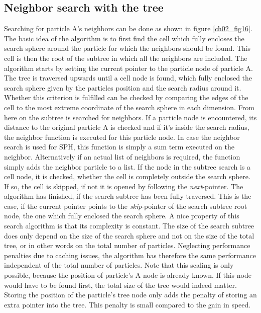 \subsection{Neighbor search with the tree}
Searching for particle A's neighbors can be done as shown in figure \ref{ch02_fig16}. The basic idea of the algorithm is to first find the cell which fully encloses the search sphere around the particle for which the neighbors should be found. This cell is then the root of the subtree in which all the neighbors are included. The algorithm starts by setting the current pointer to the particle node of  particle A. The tree is traversed upwards until a cell node is found, which fully enclosed the search sphere given by the particles position and the search radius around it. Whether this criterion is fulfilled can be checked by comparing the edges of the cell to the most extreme coordinate of the search sphere in each dimension. From here on the subtree is searched for neighbors. If a particle node is encountered, its distance to the original particle A is checked and if it's inside the search radius, the neighbor function is executed for this particle node. In case the neighbor search is used for SPH, this function is simply a sum term executed on the neighbor. Alternatively if an actual list of neighbors is required, the function simply adds the neighbor particle to a list. If the node in the subtree search is a cell node, it is checked, whether the cell is completely outside the search sphere. If so, the cell is skipped, if not it is opened by following the \emph{next}-pointer. The algorithm has finished, if the search subtree has been fully traversed. This is the case, if the current pointer points to the \emph{skip}-pointer of the search subtree root node, the one which fully enclosed the search sphere. 
A nice property of this search algorithm is that its complexity is constant. The size of the search subtree does only depend on the size of the search sphere and not on the size of the total tree, or in other words on the total number of particles. Neglecting performance penalties due to caching issues, the algorithm has therefore the same performance independent of the total number of particles. Note that this scaling is only possible, because the position of particle's A node is already known. If this node would have to be found first, the total size of the tree would indeed matter. Storing the position of the particle's tree node only adds the penalty of storing an extra pointer into the tree. This penalty is small compared to the gain in speed.

